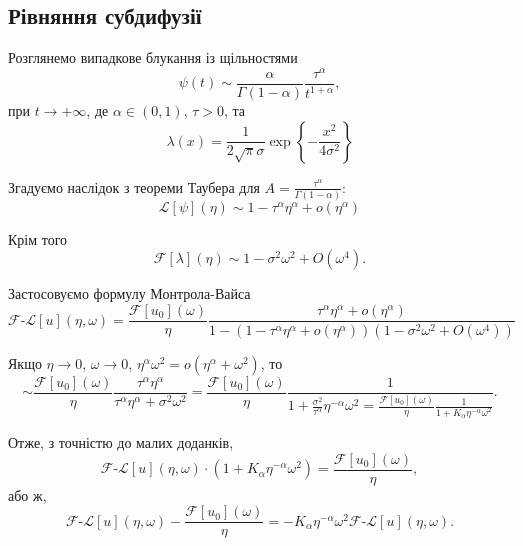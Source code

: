 
\subsection{Рівняння субдифузії}

Розглянемо випадкове блукання із щільностями
\begin{equation}
    \psi(t) \sim \frac{\alpha}{\Gamma(1 - \alpha)} \frac{\tau^\alpha}{t^{1 + \alpha}},
\end{equation}
при $t \to + \infty$, де $\alpha \in (0, 1)$, $\tau > 0$, та
\begin{equation}
    \lambda(x) = \frac{1}{2 \sqrt{\pi} \sigma} \exp\left\{-\frac{x^2}{4 \sigma^2}\right\}
\end{equation}

Згадуємо наслідок з теореми Таубера для $A = \frac{\tau^\alpha}{\Gamma(1 - \alpha)}$:
\begin{equation}
    \mathscr{L}[\psi](\eta) \sim 1 - \tau^\alpha \eta^\alpha + o(\eta^\alpha)
\end{equation}

Крім того
\begin{equation}
    \mathcal{F}[\lambda](\eta) \sim 1 - \sigma^2 \omega^2 + O(\omega^4).
\end{equation}

Застосовуємо формулу Монтрола-Вайса
\begin{equation}
    \mathcal{F}\text{-}\mathscr{L}[u](\eta,\omega) = \frac{\mathcal{F}[u_0](\omega)}{\eta} \frac{\tau^\alpha \eta^\alpha + o(\eta^\alpha)}{1 - (1 - \tau^\alpha \eta^\alpha + o(\eta^\alpha)) (1 - \sigma^2 \omega^2 + O(\omega^4))} 
\end{equation}

Якщо $\eta \to 0$, $\omega \to 0$, $\eta^\alpha \omega^2 = o(\eta^\alpha + \omega^2)$, то
\begin{equation}
    \sim \frac{\mathcal{F}[u_0](\omega)}{\eta} \frac{\tau^\alpha \eta^\alpha}{\tau^\alpha \eta^\alpha + \sigma^2 \omega^2} = \frac{\mathcal{F}[u_0](\omega)}{\eta} \frac{1}{1 + \frac{\sigma^2}{\tau^\alpha} \eta^{-\alpha} \omega^2 = \frac{\mathcal{F}[u_0](\omega)}{\eta} \frac{1}{1 + K_\alpha \eta^{-\alpha} \omega^2}}.
\end{equation}

Отже, з точністю до малих доданків,
\begin{equation}
    \mathcal{F}\text{-}\mathscr{L}[u](\eta,\omega) \cdot (1 + K_\alpha \eta^{-\alpha} \omega^2) = \frac{\mathcal{F}[u_0](\omega)}{\eta},
\end{equation}
або ж,
\begin{equation}
    \mathcal{F}\text{-}\mathscr{L}[u](\eta,\omega) - \frac{\mathcal{F}[u_0](\omega)}{\eta} = - K_\alpha \eta^{-\alpha} \omega^2 \mathcal{F}\text{-}\mathscr{L}[u](\eta,\omega).
\end{equation}

